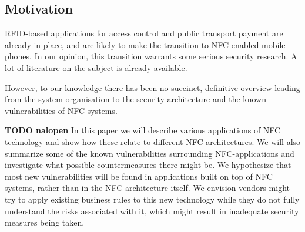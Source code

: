 
\subsection{Motivation}
RFID-based applications for access control and public transport payment are already in place, and are likely to make the transition to NFC-enabled mobile phones.
In our opinion, this transition warrants some serious security research.
A lot of literature on the subject is already available.

However, to our knowledge there has been no succinct, definitive overview leading from the system organisation to the security architecture and the known vulnerabilities of NFC systems.



\textbf{TODO nalopen}
In this paper we will describe various applications of NFC technology and show how these relate to different NFC architectures.
We will also summarize some of the known vulnerabilities surrounding NFC-applications and investigate what possible countermeasures there might be.
We hypothesize that most new vulnerabilities will be found in applications built on top of NFC systems, rather than in the NFC architecture itself.
We envision vendors might try to apply existing business rules to this new technology while they do not fully understand the risks associated with it, which might result in inadequate security measures being taken.


